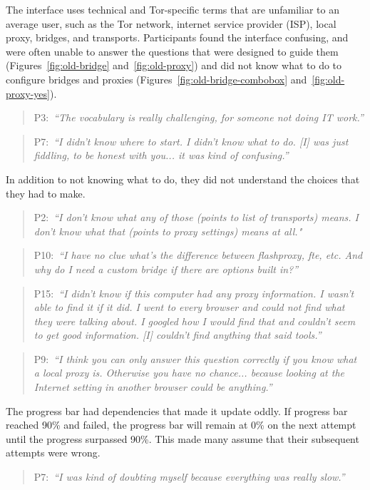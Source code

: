 \documentclass[USenglish,oneside,twocolumn]{article}
\newcommand{\pquote}[2]{
\begin{quotation}
\noindent #1:~\textit{#2}
\end{quotation}
}
\begin{document}
The interface uses technical and Tor-specific terms that are unfamiliar to an average user, such as the Tor network, internet service provider (ISP), local proxy, bridges, and transports. Participants found the interface confusing, and were often unable to answer the questions that were designed to guide them (Figures~\ref{fig:old-bridge} and~\ref{fig:old-proxy}) and did not know what to do to configure bridges and proxies (Figures~\ref{fig:old-bridge-combobox} and~\ref{fig:old-proxy-yes}).

\pquote{P3}{``The vocabulary is really challenging, for someone not doing IT work.''}

\pquote{P7}{``I didn't know where to start. I didn't know what to do. [I] was just fiddling, to be honest with you... it was kind of confusing.''}

In addition to not knowing what to do, they did not understand the choices that they had to make. 

\pquote{P2}{``I don't know what any of those (points to list of transports) means. I don't know what that (points to proxy settings) means at all."}

\pquote{P10}{``I have no clue what's the difference between flashproxy, fte, etc. And why do I need a custom bridge if there are options built in?''}

\pquote{P15}{``I didn't know if this computer had any proxy information. I wasn't able to find it if it did. I went to every browser and could not find what they were talking about. I googled how I would find that and couldn't seem to get good information. [I] couldn't find anything that said tools.''}

\pquote{P9}{``I think you can only answer this question correctly if you know what a local proxy is.
Otherwise you have no chance... because looking at the Internet setting in another browser could be anything.''}

The progress bar had dependencies that made it update oddly. If progress bar reached 90\% and failed, the progress bar will remain at 0\% on the next attempt until the progress surpassed 90\%. This made many assume that their subsequent attempts were wrong.

\pquote{P7}{``I was kind of doubting myself because everything was really slow.''}
\end{document}
